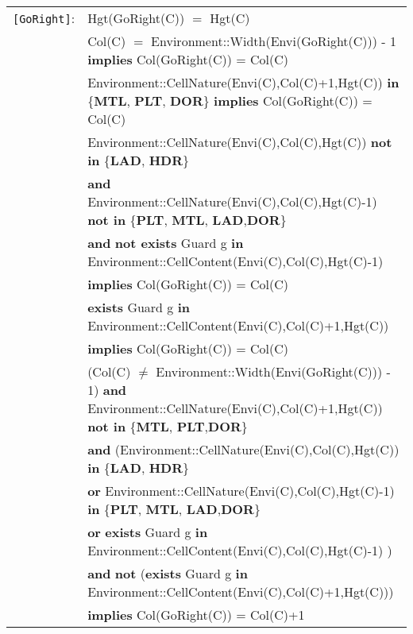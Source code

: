 \documentclass[7pt]{article}
\begin{document}
\begin{tabular}{rl}
\texttt{[GoRight]}: & \textrm{Hgt(GoRight(C))} $=$ \textrm{Hgt(C)} \\
& \textrm{Col(C)} $=$ Environment::Width(Envi(GoRight(C))) - 1 \textbf{implies} \textrm{Col(GoRight(C))} = \textrm{Col(C)} \\
& \textrm{Environment::CellNature(Envi(C),Col(C)+1,Hgt(C))} \textbf{in} \{\textbf{MTL}, \textbf{PLT}, \textbf{DOR}\} \textbf{implies} \textrm{Col(GoRight(C))} = \textrm{Col(C)} \\
& \textrm{Environment::CellNature(Envi(C),Col(C),Hgt(C))} \textbf{not in} \{\textbf{LAD}, \textbf{HDR}\}
\\ & \quad\quad \textbf{and} \textrm{Environment::CellNature(Envi(C),Col(C),Hgt(C)-1)} \textbf{not in} \{\textbf{PLT}, \textbf{MTL}, \textbf{LAD},\textbf{DOR}\} \\
& \quad\quad \textbf{and} \textbf{not exists} \textrm{Guard} g \textbf{in} \textrm{Environment::CellContent(Envi(C),Col(C),Hgt(C)-1)} \\
& \quad\quad \textbf{implies} \textrm{Col(GoRight(C))} = \textrm{Col(C)} \\
& \textbf{exists} \textrm{Guard} g \textbf{in} \textrm{Environment::CellContent(Envi(C),Col(C)+1,Hgt(C))} \\ & \quad\quad \textbf{implies} \textrm{Col(GoRight(C))} = \textrm{Col(C)} \\

& (\textrm{Col(C)} $\neq$  Environment::Width(Envi(GoRight(C))) - 1) \textbf{and} \textrm{Environment::CellNature(Envi(C),Col(C)+1,Hgt(C))} \textbf{not in} \{\textbf{MTL}, \textbf{PLT},\textbf{DOR}\} \\
& \quad\quad \textbf{and} (\textrm{Environment::CellNature(Envi(C),Col(C),Hgt(C))} \textbf{in} \{\textbf{LAD}, \textbf{HDR}\} \\
& \quad\quad\quad\quad \textbf{or} \textrm{Environment::CellNature(Envi(C),Col(C),Hgt(C)-1)} \textbf{in} \{\textbf{PLT}, \textbf{MTL}, \textbf{LAD},\textbf{DOR}\} \\
& \quad\quad\quad\quad \textbf{or} \textbf{exists} \textrm{Guard} g \textbf{in} \textrm{Environment::CellContent(Envi(C),Col(C),Hgt(C)-1)} ) \\
& \quad\quad \textbf{and} \textbf{not} (\textbf{exists} \textrm{Guard} g \textbf{in} \textrm{Environment::CellContent(Envi(C),Col(C)+1,Hgt(C))}) \\
& \quad\quad \textbf{implies} \textrm{Col(GoRight(C))} = \textrm{Col(C)}+1 \\

\end{tabular}
\end{document}
